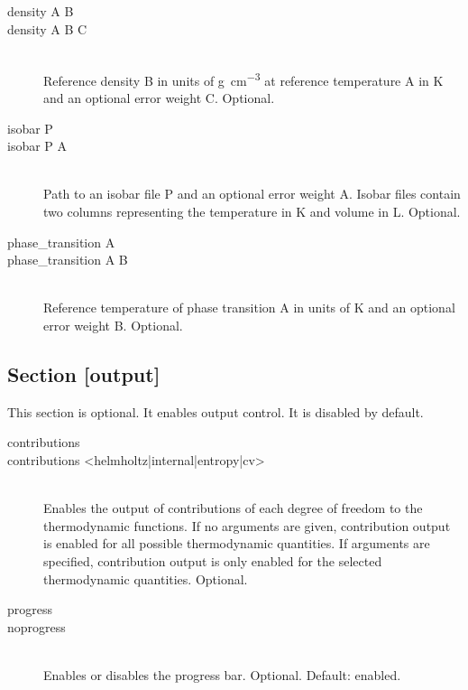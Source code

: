 \documentclass{scrartcl}
\begin{document}
\begin{description}
    \item[density A B]
    \item[density A B C] \hfill \\
        Reference density B in units of \si{\gram\per\cubic\centi\meter} at reference temperature A in \si{\kelvin} and an optional error weight C.
        Optional.
        \vspace{0.1cm}
    \item[isobar P]
    \item[isobar P A] \hfill \\
        Path to an isobar file P and an optional error weight A.
        Isobar files contain two columns representing the temperature in \si{\kelvin} and volume in \si{\liter}.
        Optional.
        \vspace{0.1cm}
    \item[phase\_transition A]
    \item[phase\_transition A B] \hfill \\
        Reference temperature of phase transition A in units of \si{\kelvin} and an optional error weight B.
        Optional.
\end{description}

\subsection{Section [output]}

This section is optional.
It enables output control.
It is disabled by default.

\begin{description}
    \item[contributions]
    \item[contributions <helmholtz|internal|entropy|cv>] \hfill \\
        Enables the output of contributions of each degree of freedom to the thermodynamic functions.
        If no arguments are given, contribution output is enabled for all possible thermodynamic quantities.
        If arguments are specified, contribution output is only enabled for the selected thermodynamic quantities.
        Optional.
    \item[progress]
    \item[noprogress] \hfill \\
        Enables or disables the progress bar.
        Optional. Default: enabled.
\end{description}
\end{document}
